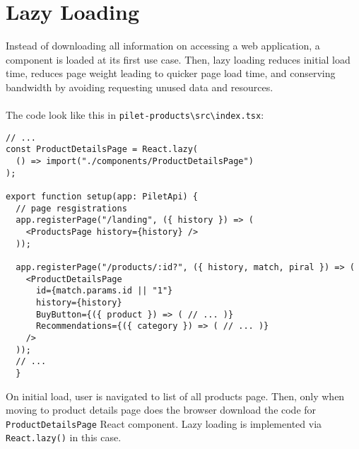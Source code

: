 \documentclass[a4paper]{book}
\begin{document}
\section{Lazy Loading}
Instead of downloading all information on accessing a web application, a component is loaded at its first use case. Then, lazy loading reduces initial load time, reduces page weight leading to quicker page load time, and conserving bandwidth by avoiding requesting unused data and resources.
\\ \\
The code look like this in \verb|pilet-products\src\index.tsx|:
\begin{lstlisting}[caption={Lazy loading of a React component in pilet-products index.tsx file}]
  // ...
const ProductDetailsPage = React.lazy(
  () => import("./components/ProductDetailsPage")
);

export function setup(app: PiletApi) {
  // page resgistrations
  app.registerPage("/landing", ({ history }) => ( 
    <ProductsPage history={history} />
  ));

  app.registerPage("/products/:id?", ({ history, match, piral }) => (
    <ProductDetailsPage
      id={match.params.id || "1"}
      history={history}
      BuyButton={({ product }) => ( // ... )}
      Recommendations={({ category }) => ( // ... )}
    />
  ));
  // ...
  }
\end{lstlisting}
On initial load, user is navigated to list of all products page. Then, only when moving to product details page does the browser download the code for \verb|ProductDetailsPage| React component. Lazy loading is implemented via \verb|React.lazy()|\cite{ReactLazy} in this case.
\end{document}
